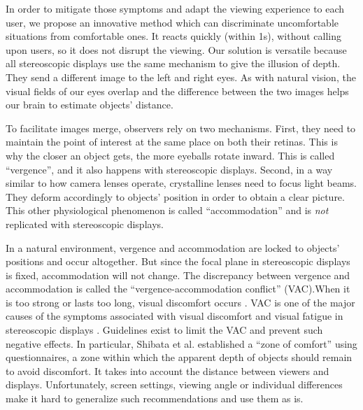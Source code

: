 \documentclass{template/llncs}
\begin{document}
In order to mitigate those symptoms and adapt the viewing experience to each user, we propose an innovative method which can discriminate uncomfortable situations from comfortable ones. It reacts quickly (within 1s), without calling upon users, so it does not disrupt the viewing. Our solution is versatile because all stereoscopic displays use the same mechanism to give the illusion of depth. They send a different image to the left and right eyes. As with natural vision, the visual fields of our eyes overlap and the difference between the two images helps our brain to estimate objects' distance.

To facilitate images merge, observers rely on two mechanisms. First, they need to maintain the point of interest at the same place on both their retinas. This is why the closer an object gets, the more eyeballs rotate inward. This is called ``vergence'', and it also happens with stereoscopic displays. Second, in a way similar to how camera lenses operate, crystalline lenses need to focus light beams. They deform accordingly to objects' position in order to obtain a clear picture. This other physiological phenomenon is called ``accommodation'' and is \emph{not} replicated with stereoscopic displays.



In a natural environment, vergence and accommodation are locked to objects' positions and occur altogether. But since the focal plane in stereoscopic displays is fixed, accommodation will not change. 
The discrepancy between vergence and accommodation is called the ``vergence-accommodation conflict'' (VAC).When it is too strong or lasts too long, visual discomfort occurs \cite{Lambooij2009}. VAC is one of the major causes of the symptoms associated with visual discomfort and visual fatigue in stereoscopic displays \cite{Lambooij2009}. Guidelines exist to limit the VAC and prevent such negative effects. In particular, Shibata et al. \cite{Shibata2011} established a ``zone of comfort'' using questionnaires, a zone within which the apparent depth of objects should remain to avoid discomfort.
It takes into account the distance between viewers and displays. Unfortunately, screen settings, viewing angle or individual differences \cite{Lambooij2009} make it hard to generalize such recommendations and use them as is.
\end{document}
